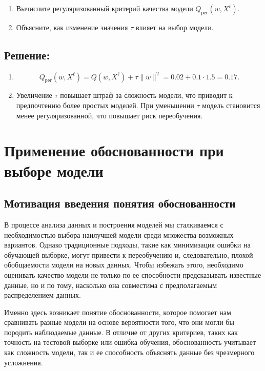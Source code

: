 \begin{enumerate}
    \item Вычислите регуляризованный критерий качества модели $Q_{\text{рег}}(w, X^\ell)$.
    \item Объясните, как изменение значения $\tau$ влияет на выбор модели.
\end{enumerate}

\subsection*{Решение:}

\begin{enumerate}
    \item
    \[
    Q_{\text{рег}}(w, X^\ell) = Q(w, X^\ell) + \tau \|w\|^2 = 0.02 + 0.1 \cdot 1.5 = 0.17.
    \]
    \item Увеличение $\tau$ повышает штраф за сложность модели, что приводит к предпочтению более простых моделей. При уменьшении $\tau$ модель становится менее регуляризованной, что повышает риск переобучения.
\end{enumerate}

\section{Применение обоснованности при выборе модели}

\subsection{Мотивация введения понятия обоснованности}

В процессе анализа данных и построения моделей мы сталкиваемся с необходимостью выбора наилучшей модели среди множества возможных вариантов. Однако традиционные подходы, такие как минимизация ошибки на обучающей выборке, могут привести к переобучению и, следовательно, плохой обобщаемости модели на новых данных. Чтобы избежать этого, необходимо оценивать качество модели не только по ее способности предсказывать известные данные, но и по тому, насколько она совместима с предполагаемым распределением данных.

Именно здесь возникает понятие обоснованности, которое помогает нам сравнивать разные модели на основе вероятности того, что они могли бы породить наблюдаемые данные. В отличие от других критериев, таких как точность на тестовой выборке или ошибка обучения, обоснованность учитывает как сложность модели, так и ее способность объяснять данные без чрезмерного усложнения.

